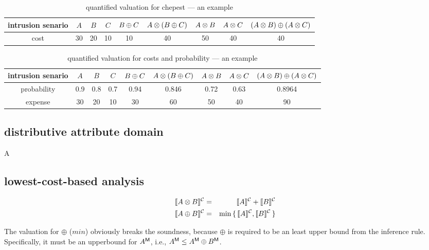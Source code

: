 \begin{table}[htb]
\begin{center}
  \begin{tabular}{c|ccc|c|cccc} 
   intrusion senario & $A$ & $B$ & $C$ & $B \oplus C$ & $A \otimes (B \oplus C)$ &
   $A \otimes B$ & $A \otimes C$ & $( A \otimes B) \oplus (A \otimes C)$  \\ \hline
    cost & 30 & 20 & 10  & 10  & 40 & 50 & 40 & 40 \\
  \end{tabular}
\end{center}
\caption{quantified valuation for chepest  --- an example}
\end{table}


\newcommand{\QVaTimesC}{A \otimes C}
\newcommand{\QVbTimesC}{B \otimes C}

\begin{table}[htb]
\begin{center}
  \begin{tabular}{c|ccc|c|cccc} 
   intrusion senario & $A$ & $B$ & $C$ & $B \oplus C$ & $A \otimes (B \oplus C)$ &
   $A \otimes B$ & $A \otimes C$ & $( A \otimes B) \oplus (A \otimes C)$  \\ \hline
   probability & 0.9 & 0.8 & 0.7 & 0.94 & 0.846 & 0.72 & 0.63 & 0.8964  \\
   expense & 30 & 20 & 10  & 30  & 60 & 50 & 40 & 90 \\
  \end{tabular}
\end{center}
\caption{quantified valuation for costs and probability --- an example}
\end{table}

\subsection{distributive attribute domain}

A

\subsection{lowest-cost-based analysis}

\begin{eqnarray*}
\llbracket {A \otimes B} \rrbracket^{\mathcal{C}} &=& \llbracket {A} \rrbracket^{\mathcal{C}} + \llbracket {B} \rrbracket^{\mathcal{C}} \\
\llbracket {A \oplus B} \rrbracket^{\mathcal{C}} &=& \min \set{\llbracket {A} \rrbracket^{\mathcal{C}},\llbracket {B} \rrbracket^{\mathcal{C}}} 
\end{eqnarray*}

The valuation for $\oplus$ ($min{}$) obviously breaks the soundness,
because  $\oplus$ is required to be an least upper bound from the inference rule. 
Specifically, it must be an upperbound for ${A}^{\sf M}$,
 i.e., ${A}^{\sf M} \leq {A}^{\sf M} \oplus {B}^{\sf M}$.


